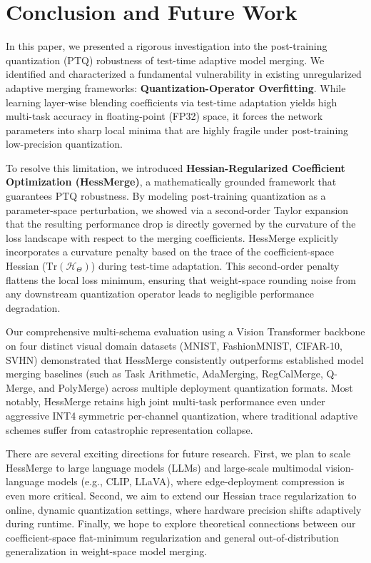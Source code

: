 \section{Conclusion and Future Work}
\label{sec:conclusion}

In this paper, we presented a rigorous investigation into the post-training quantization (PTQ) robustness of test-time adaptive model merging. We identified and characterized a fundamental vulnerability in existing unregularized adaptive merging frameworks: \textbf{Quantization-Operator Overfitting}. While learning layer-wise blending coefficients via test-time adaptation yields high multi-task accuracy in floating-point (FP32) space, it forces the network parameters into sharp local minima that are highly fragile under post-training low-precision quantization.

To resolve this limitation, we introduced \textbf{Hessian-Regularized Coefficient Optimization (HessMerge)}, a mathematically grounded framework that guarantees PTQ robustness. By modeling post-training quantization as a parameter-space perturbation, we showed via a second-order Taylor expansion that the resulting performance drop is directly governed by the curvature of the loss landscape with respect to the merging coefficients. HessMerge explicitly incorporates a curvature penalty based on the trace of the coefficient-space Hessian ($\text{Tr}(\mathcal{H}_{\Theta})$) during test-time adaptation. This second-order penalty flattens the local loss minimum, ensuring that weight-space rounding noise from any downstream quantization operator leads to negligible performance degradation.

Our comprehensive multi-schema evaluation using a Vision Transformer backbone on four distinct visual domain datasets (MNIST, FashionMNIST, CIFAR-10, SVHN) demonstrated that HessMerge consistently outperforms established model merging baselines (such as Task Arithmetic, AdaMerging, RegCalMerge, Q-Merge, and PolyMerge) across multiple deployment quantization formats. Most notably, HessMerge retains high joint multi-task performance even under aggressive INT4 symmetric per-channel quantization, where traditional adaptive schemes suffer from catastrophic representation collapse.

There are several exciting directions for future research. First, we plan to scale HessMerge to large language models (LLMs) and large-scale multimodal vision-language models (e.g., CLIP, LLaVA), where edge-deployment compression is even more critical. Second, we aim to extend our Hessian trace regularization to online, dynamic quantization settings, where hardware precision shifts adaptively during runtime. Finally, we hope to explore theoretical connections between our coefficient-space flat-minimum regularization and general out-of-distribution generalization in weight-space model merging.
